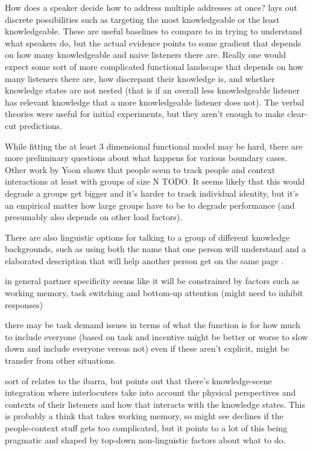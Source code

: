 \documentclass[]{article}
\begin{document}
How does a speaker decide how to address multiple addresses at once? \cite{yoon2018} lays out discrete possibilities such as targeting the most knowledgeable or the least knowledgeable. These are useful baselines to compare to in trying to understand what speakers do, but the actual evidence points to some gradient that depends on how many knowledgeable and naive listeners there are.  Really one would expect some sort of more complicated functional landscape that depends on how many listeners there are, how discrepant their knowledge is, and whether knowledge states are not nested (that is if an overall less knowledgeable listener has relevant knowledge that a more knowledgeable listener does not). The verbal theories were useful for initial experiments, but they aren't enough to make clear-cut predictions. 

While fitting the at least 3 dimensional functional model may be hard, there are more preliminary questions about what happens for various boundary cases. Other work by Yoon shows that people seem to track people and context interactions at least with groups of size N TODO. It seems likely that this would degrade a groups get bigger and it's harder to track individual identity, but it's an empirical matter how large groups have to be to degrade performance (and presumably also depends on other load factors). 

There are also linguistic options for talking to a group of different knowledge backgrounds, such as using both the name that one person will understand and a elaborated description that will help another person get on the same page \cite{yoon2018}.


in general partner specificity seems like it will be constrained by factors such as working memory, task switching and bottom-up attention (might need to inhibit responses) 


\cite{yoon2019} there may be task demand issues in terms of what the function is for how much to include everyone (based on task and incentive might be better or worse to slow down and include everyone versus not) even if these aren't explicit, might be transfer from other situations. 

sort of relates to the ibarra, but \cite{yoon2019a} points out that there's knowledge-scene integration where interlocuters take into account the physical perspectives and contexts of their listeners and how that interacts with the knowledge states. This is probably a think that takes working memory, so might see declines if the people-context stuff gets too complicated, but it points to a lot of this being pragmatic and shaped by top-down non-linguistic factors about what to do. 
\end{document}
